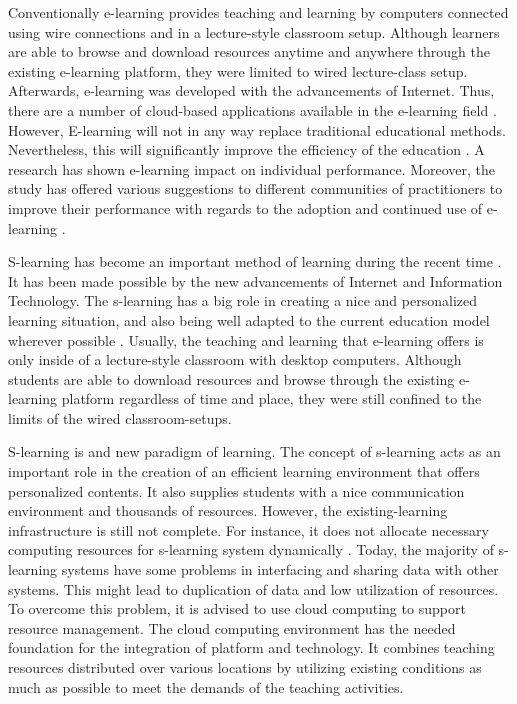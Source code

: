\documentclass[journal]{vgtc}
\begin{document}
Conventionally e-learning provides teaching and learning by computers connected using wire connections and in a lecture-style classroom setup. Although learners are able to browse and download resources anytime and anywhere through the existing e-learning platform, they were limited to wired lecture-class setup. Afterwards, e-learning was developed with the advancements of Internet. Thus, there are a number of cloud-based applications available in the e-learning field \cite{s110807835}. However, E-learning will not in any way replace traditional educational methods. Nevertheless, this will significantly improve the efficiency of the education \cite{SudhirKumarSharmaNidhiGoyal2014}. A research has shown e-learning impact on individual performance. Moreover, the study has offered various suggestions to different communities of practitioners to improve their performance with regards to the adoption and continued use of e-learning \cite{Mohammadyari2014}.

S-learning has become an important method of learning during the recent time \cite{Kim2013}. It has been made possible by the new advancements of Internet and Information Technology. The s-learning has a big role in creating a nice and personalized learning situation, and also being well adapted to the current education model wherever possible \cite{Uden2007}. Usually, the teaching and learning that e-learning offers is only inside of a lecture-style classroom with desktop computers. Although students are able to download resources and browse through the existing e-learning platform regardless of time and place, they were still confined to the limits of the wired classroom-setups.

S-learning is and new paradigm of learning. The concept of s-learning acts as an important role in the creation of an efficient learning environment that offers personalized contents. It also supplies students with a nice communication environment and thousands of resources. However, the existing-learning infrastructure is still not complete. For instance, it does not allocate necessary computing resources for s-learning system dynamically \cite{Uden2007}. Today, the majority of s-learning systems have some problems in interfacing and sharing data with other systems. This might lead to duplication of data and low utilization of resources. To overcome this problem, it is advised to use cloud computing to support resource management. The cloud computing environment has the needed foundation for the integration of platform and technology. It combines teaching resources distributed over various locations by utilizing existing conditions as much as possible to meet the demands of the teaching activities.
\end{document}
